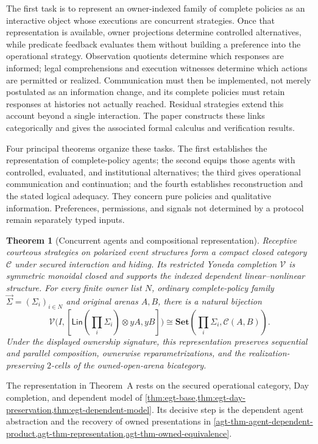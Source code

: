 \documentclass[11pt,a4paper]{article}
\numberwithin{equation}{section}
\theoremstyle{definition}
\theoremstyle{remark}
\theoremstyle{plain}
\newtheorem{maintheorem}{Theorem}
\begin{document}
The first task is to represent an owner-indexed family of complete policies
as an interactive object whose executions are concurrent strategies. Once
that representation is available, owner projections determine controlled
alternatives, while predicate feedback evaluates them without building a
preference into the operational strategy. Observation quotients determine
which responses are informed; legal comprehensions and execution witnesses
determine which actions are permitted or realized. Communication must then
be implemented, not merely postulated as an information change, and its
complete policies must retain responses at histories not actually reached.
Residual strategies extend this account beyond a single interaction. The
paper constructs these links categorically and gives the associated formal
calculus and verification results.

Four principal theorems organize these tasks. The first establishes the
representation of complete-policy agents; the second equips those agents
with controlled, evaluated, and institutional alternatives; the third gives
operational communication and continuation; and the fourth establishes
reconstruction and the stated logical adequacy. They concern pure policies
and qualitative information. Preferences, permissions, and signals not
determined by a protocol remain separately typed inputs.

\begin{maintheorem}[Concurrent agents and compositional representation]
\label{main:A}
Receptive courteous strategies on polarized event structures form a compact
closed category $\mathcal C$ under secured interaction and hiding.
Its restricted Yoneda completion $\mathcal V$ is symmetric monoidal closed
and supports the indexed dependent linear--nonlinear structure.  For every
finite owner list $N$, ordinary complete-policy family
$\vec\Sigma=(\Sigma_i)_{i\in N}$ and original arenas $A,B$,
there is a natural bijection
\[
\mathcal V\bigl(I,[\mathsf{Lin}(\prod_i\Sigma_i)\otimes yA,yB]\bigr)
\cong\mathbf{Set}(\prod_i\Sigma_i,\mathcal C(A,B)).
\]
Under the displayed ownership signature, this representation preserves
sequential and parallel composition, ownerwise reparametrizations, and
the realization-preserving $2$-cells of the owned-open-arena bicategory.
\end{maintheorem}

The representation in Theorem~A rests on the secured operational
category, Day completion, and dependent model of
\cref{thm:egt-base,thm:egt-day-preservation,thm:egt-dependent-model}.
Its decisive step is the dependent agent abstraction and the recovery of
owned presentations in
\cref{agt-thm-agent-dependent-product,agt-thm-representation,agt-thm-owned-equivalence}.
\end{document}
